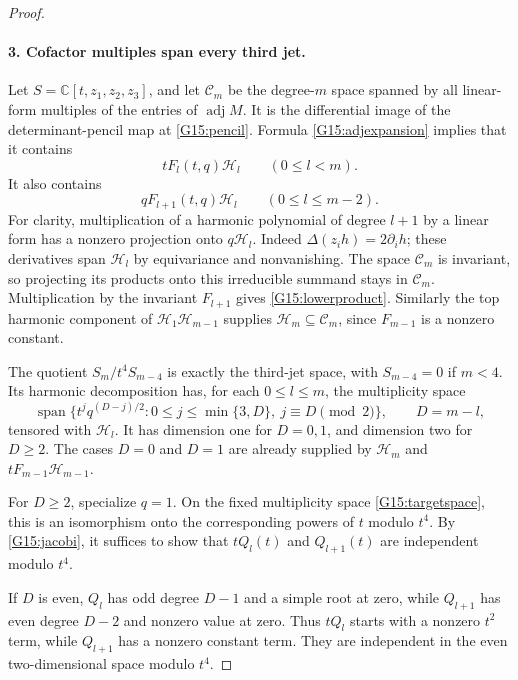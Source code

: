 \documentclass[11pt,a4paper]{article}
\theoremstyle{definition}\newtheorem{definition}{Definition}
\begin{document}
\begin{proof}
\paragraph{3. Cofactor multiples span every third jet.}
Let $S=\mathbb C[t,z_1,z_2,z_3]$, and let $\mathcal C_m$
be the degree-$m$ space spanned by all linear-form
multiples of the entries of $\operatorname{adj} M$.
It is the differential image of the determinant-pencil
map at \eqref{G15:pencil}. Formula
\eqref{G15:adjexpansion} implies that it contains
\[
 tF_l(t,q)\mathcal H_l\qquad(0\leq l<m).
\]
It also contains
\begin{equation}\label{G15:lowerproduct}
 qF_{l+1}(t,q)\mathcal H_l\qquad(0\leq l\leq m-2).
\end{equation}
For clarity, multiplication of a harmonic polynomial of
degree $l+1$ by a linear form has a nonzero projection
onto $q\mathcal H_l$. Indeed
$\Delta(z_i h)=2\partial_i h$; these derivatives span
$\mathcal H_l$ by equivariance and nonvanishing.
The space $\mathcal C_m$ is invariant, so projecting
its products onto this irreducible summand stays in
$\mathcal C_m$. Multiplication by the invariant
$F_{l+1}$ gives \eqref{G15:lowerproduct}.
Similarly the top harmonic component of
$\mathcal H_1\mathcal H_{m-1}$ supplies
$\mathcal H_m\subseteq\mathcal C_m$, since
$F_{m-1}$ is a nonzero constant.

The quotient $S_m/t^4S_{m-4}$ is exactly the third-jet
space, with $S_{m-4}=0$ if $m<4$. Its harmonic
decomposition has, for each $0\leq l\leq m$, the
multiplicity space
\begin{equation}\label{G15:targetspace}
 \operatorname{span}\{t^j q^{(D-j)/2}:
         0\leq j\leq\min\{3,D\},\ j\equiv D\pmod2\},
 \qquad D=m-l,
\end{equation}
tensored with $\mathcal H_l$. It has dimension one
for $D=0,1$, and dimension two for $D\geq2$.
The cases $D=0$ and $D=1$ are already supplied by
$\mathcal H_m$ and $tF_{m-1}\mathcal H_{m-1}$.

For $D\geq2$, specialize $q=1$. On the fixed
multiplicity space \eqref{G15:targetspace}, this is
an isomorphism onto the corresponding powers of $t$
modulo $t^4$. By \eqref{G15:jacobi}, it suffices to
show that $tQ_l(t)$ and $Q_{l+1}(t)$ are independent
modulo $t^4$.

If $D$ is even, $Q_l$ has odd degree $D-1$ and a
simple root at zero, while $Q_{l+1}$ has even degree
$D-2$ and nonzero value at zero. Thus $tQ_l$ starts
with a nonzero $t^2$ term, while $Q_{l+1}$ has a
nonzero constant term. They are independent in the
even two-dimensional space modulo $t^4$.


\end{proof}
\end{document}
